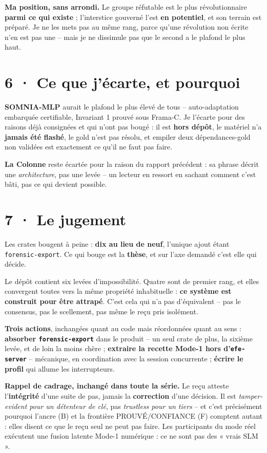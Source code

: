 \documentclass[10pt]{article}
\newcommand{\code}[1]{\texttt{\small #1}}
\begin{document}
\textbf{Ma position, sans arrondi.} Le groupe réfutable est le plus révolutionnaire \textbf{parmi ce
qui existe} ; l'interstice gouverné l'est \textbf{en potentiel}, et son terrain est préparé. Je ne les
mets pas au même rang, parce qu'une révolution non écrite n'en est pas une -- mais je ne dissimule pas
que le second a le plafond le plus haut.

\section{6 · Ce que j'écarte, et pourquoi}

\textbf{SOMNIA-MLP} aurait le plafond le plus élevé de tous -- auto-adaptation embarquée certifiable,
Invariant 1 prouvé sous Frama-C. Je l'écarte pour des raisons déjà consignées et qui n'ont pas bougé :
il est \textbf{hors dépôt}, le matériel n'a \textbf{jamais été flashé}, le gold n'est pas résolu, et
empiler deux dépendances-gold non validées est exactement ce qu'il ne faut pas faire.

\textbf{La Colonne} reste écartée pour la raison du rapport précédent : sa phrase décrit une
\emph{architecture}, pas une levée -- un lecteur en ressort en sachant comment c'est bâti, pas ce qui
devient possible.

\section{7 · Le jugement}

Les crates bougent à peine : \textbf{dix au lieu de neuf}, l'unique ajout étant \code{forensic-export}. Ce qui
bouge est la \textbf{thèse}, et sur l'axe demandé c'est elle qui décide.

Le dépôt contient six levées d'impossibilité. Quatre sont de premier rang, et elles convergent toutes
vers la même propriété inhabituelle : \textbf{ce système est construit pour être attrapé}. C'est cela
qui n'a pas d'équivalent -- pas le consensus, pas le scellement, pas même le reçu pris isolément.

\textbf{Trois actions}, inchangées quant au code mais réordonnées quant au sens :
\textbf{absorber \code{forensic-export}} dans le produit -- un seul crate de plus, la sixième levée, et de loin
la moins chère ; \textbf{extraire la recette Mode-1 hors d'\code{efe-server}} -- mécanique, en
coordination avec la session concurrente ; \textbf{écrire le profil} qui allume les interrupteurs.

\begin{these}
\small\textbf{Rappel de cadrage, inchangé dans toute la série.} Le reçu atteste l'\textbf{intégrité}
d'une suite de pas, jamais la \textbf{correction} d'une décision. Il est \emph{tamper-evident pour un
détenteur de clé}, pas \emph{trustless pour un tiers} -- et c'est précisément pourquoi l'ancre (B) et
la frontière PROUVÉ/CONFIANCE (F) comptent autant : elles disent ce que le reçu seul ne peut pas
faire. Les participants du mode réel exécutent une fusion latente Mode-1 numérique : ce ne sont pas des
« vrais SLM ».
\end{these}
\end{document}
